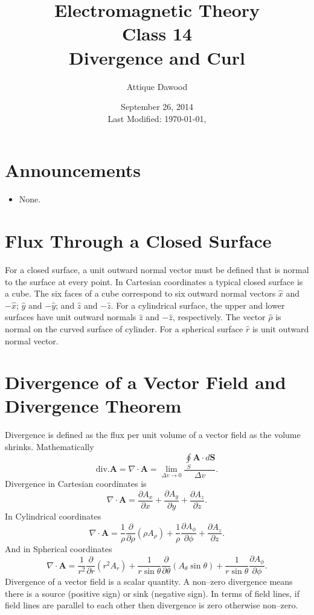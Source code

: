 \documentclass[12pt,a4paper]{article}
\title{Electromagnetic Theory\\Class 14\\Divergence and Curl}
\author{Attique Dawood}
\date{September 26, 2014\\[0.2cm] Last Modified: \today, \currenttime}
\begin{document}
\maketitle
\section{Announcements}
\begin{itemize}
\item None.
\end{itemize}
\section{Flux Through a Closed Surface}
For a closed surface, a unit outward normal vector must be defined that is normal to the surface at every point. In Cartesian coordinates a typical closed surface is a cube. The six faces of a cube correspond to six outward normal vectors $\hat x$ and $-\hat x$; $\hat y$ and $-\hat y$; and $\hat z$ and $-\hat z$. For a cylindrical surface, the upper and lower surfaces have unit outward normals $\hat z$ and $-\hat z$, respectively. The vector $\hat\rho$ is normal on the curved surface of cylinder. For a spherical surface $\hat r$ is unit outward normal vector.
\section{Divergence of a Vector Field and Divergence Theorem}
Divergence is defined as the flux per unit volume of a vector field as the volume shrinks. Mathematically
\begin{equation}
\mathrm{div. \textbf{A}}=\nabla\cdot\mathrm{\textbf{A}}=\lim_{\Delta v \to 0}\dfrac{\oint\limits_S\mathrm{\textbf{A}}\cdot d\mathrm{\textbf{S}}}{\Delta v}.
\end{equation}
Divergence in Cartesian coordinates is
\begin{equation}
\nabla\cdot\mathrm{\textbf{A}}=\dfrac{\partial A_x}{\partial x}+\dfrac{\partial A_y}{\partial y}+\dfrac{\partial A_z}{\partial z}.
\end{equation}
In Cylindrical coordinates
\begin{equation}
\nabla\cdot\mathrm{\textbf{A}}=\dfrac{1}{\rho}\dfrac{\partial}{\partial\rho}(\rho A_\rho)+\dfrac{1}{\rho}\dfrac{\partial A_\phi}{\partial\phi}+\dfrac{\partial A_z}{\partial z}.
\end{equation}
And in Spherical coordinates
\begin{equation}
\nabla\cdot\mathrm{\textbf{A}}=\dfrac{1}{r^2}\dfrac{\partial}{\partial r}(r^2 A_r)+\dfrac{1}{r\sin\theta}\dfrac{\partial}{\partial\theta}(A_\theta\sin\theta)+\dfrac{1}{r\sin\theta}\dfrac{\partial A_\phi}{\partial\phi}.
\end{equation}
Divergence of a vector field is a scalar quantity. A non--zero divergence means there is a source (positive sign) or sink (negative sign). In terms of field lines, if field lines are parallel to each other then divergence is zero otherwise non--zero.
\end{document}
